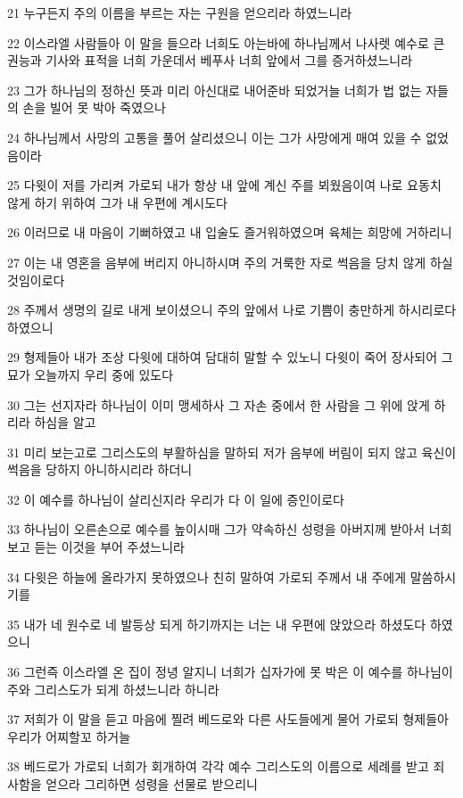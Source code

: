 \par 21 누구든지 주의 이름을 부르는 자는 구원을 얻으리라 하였느니라
\par 22 이스라엘 사람들아 이 말을 들으라 너희도 아는바에 하나님께서 나사렛 예수로 큰 권능과 기사와 표적을 너희 가운데서 베푸사 너희 앞에서 그를 증거하셨느니라
\par 23 그가 하나님의 정하신 뜻과 미리 아신대로 내어준바 되었거늘 너희가 법 없는 자들의 손을 빌어 못 박아 죽였으나
\par 24 하나님께서 사망의 고통을 풀어 살리셨으니 이는 그가 사망에게 매여 있을 수 없었음이라
\par 25 다윗이 저를 가리켜 가로되 내가 항상 내 앞에 계신 주를 뵈웠음이여 나로 요동치 않게 하기 위하여 그가 내 우편에 계시도다
\par 26 이러므로 내 마음이 기뻐하였고 내 입술도 즐거워하였으며 육체는 희망에 거하리니
\par 27 이는 내 영혼을 음부에 버리지 아니하시며 주의 거룩한 자로 썩음을 당치 않게 하실 것임이로다
\par 28 주께서 생명의 길로 내게 보이셨으니 주의 앞에서 나로 기쁨이 충만하게 하시리로다 하였으니
\par 29 형제들아 내가 조상 다윗에 대하여 담대히 말할 수 있노니 다윗이 죽어 장사되어 그 묘가 오늘까지 우리 중에 있도다
\par 30 그는 선지자라 하나님이 이미 맹세하사 그 자손 중에서 한 사람을 그 위에 앉게 하리라 하심을 알고
\par 31 미리 보는고로 그리스도의 부활하심을 말하되 저가 음부에 버림이 되지 않고 육신이 썩음을 당하지 아니하시리라 하더니
\par 32 이 예수를 하나님이 살리신지라 우리가 다 이 일에 증인이로다
\par 33 하나님이 오른손으로 예수를 높이시매 그가 약속하신 성령을 아버지께 받아서 너희 보고 듣는 이것을 부어 주셨느니라
\par 34 다윗은 하늘에 올라가지 못하였으나 친히 말하여 가로되 주께서 내 주에게 말씀하시기를
\par 35 내가 네 원수로 네 발등상 되게 하기까지는 너는 내 우편에 앉았으라 하셨도다 하였으니
\par 36 그런즉 이스라엘 온 집이 정녕 알지니 너희가 십자가에 못 박은 이 예수를 하나님이 주와 그리스도가 되게 하셨느니라 하니라
\par 37 저희가 이 말을 듣고 마음에 찔려 베드로와 다른 사도들에게 물어 가로되 형제들아 우리가 어찌할꼬 하거늘
\par 38 베드로가 가로되 너희가 회개하여 각각 예수 그리스도의 이름으로 세례를 받고 죄 사함을 얻으라 그리하면 성령을 선물로 받으리니
